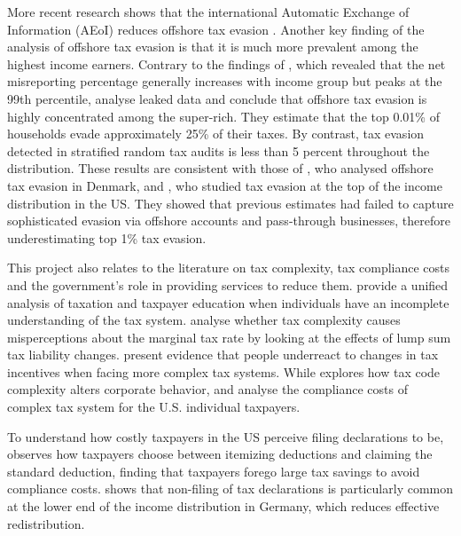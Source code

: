 \documentclass[12pt]{article}
\begin{document}
More recent research shows that the international Automatic Exchange of Information (AEoI) reduces offshore tax evasion \parencite{boas2024taxing,baselgia2023compliance}. Another key finding of the analysis of offshore tax evasion is that it is much more prevalent among the highest income earners. Contrary to the findings of \textcite{johns2010distribution}, which revealed that the net misreporting percentage generally increases with income group but peaks at the 99th percentile, \textcite{alstadsaeter2019tax} analyse leaked data and conclude that offshore tax evasion is highly concentrated among the super-rich. They estimate that the top 0.01\% of households evade approximately 25\% of their taxes. By contrast, tax evasion detected in stratified random tax audits is less than 5 percent throughout the distribution. These results are consistent with those of \textcite{boas2024taxing}, who analysed offshore tax evasion in Denmark, and \textcite{guyton2021tax}, who studied tax evasion at the top of the income distribution in the US. They showed that previous estimates had failed to capture sophisticated evasion via offshore accounts and pass-through businesses, therefore underestimating top 1\% tax evasion.

This project also relates to the literature on tax complexity, tax compliance costs and the government's role in providing services to reduce them. \textcite{craig2024tax} provide a unified analysis of taxation and taxpayer education when individuals have an incomplete understanding of the tax system. \textcite{feldman2016taxpayer} analyse whether tax complexity causes misperceptions about the marginal tax rate by looking at the effects of lump sum tax liability changes. \textcite{abeler2015complex} present evidence that people underreact to changes in tax incentives when facing more complex tax systems. While \textcite{zwick2021costs} explores how tax code complexity alters corporate behavior, \textcite{blumenthal1992compliance} and \textcite{slemrod1995income} analyse the compliance costs of complex tax system for the U.S. individual taxpayers. 

To understand how costly taxpayers in the US perceive filing declarations to be, \textcite{benzarti2020taxing} observes how taxpayers choose between itemizing deductions and claiming the standard deduction, finding that taxpayers forego large tax savings to avoid compliance costs. \textcite{hauck2024optional} shows that non-filing of tax declarations is particularly common at the lower end of the income distribution in Germany, which reduces effective redistribution. 
\end{document}
